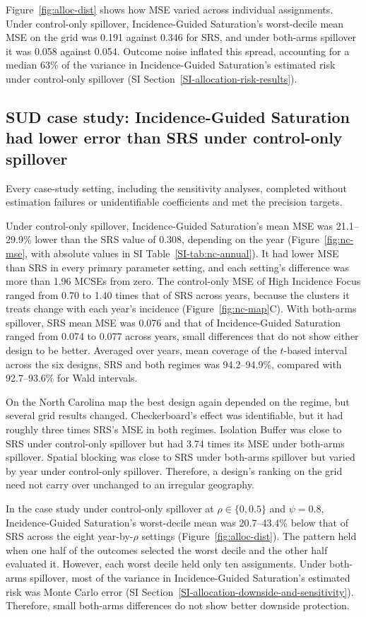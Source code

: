 \documentclass[Afour,sagev,times]{sagej}
\begin{document}
Figure~\ref{fig:alloc-dist} shows how MSE varied across individual assignments. Under control-only spillover, Incidence-Guided Saturation's worst-decile mean MSE on the grid was 0.191 against 0.346 for SRS, and under both-arms spillover it was 0.058 against 0.054. Outcome noise inflated this spread, accounting for a median 63\% of the variance in Incidence-Guided Saturation's estimated risk under control-only spillover (SI Section~\ref{SI-allocation-risk-results}).

\subsection{SUD case study: Incidence-Guided Saturation had lower error than SRS under control-only spillover}
Every case-study setting, including the sensitivity analyses, completed without estimation failures or unidentifiable coefficients and met the precision targets.

Under control-only spillover, Incidence-Guided Saturation's mean MSE was 21.1--29.9\% lower than the SRS value of 0.308, depending on the year (Figure~\ref{fig:nc-mse}, with absolute values in SI Table~\ref{SI-tab:nc-annual}). It had lower MSE than SRS in every primary parameter setting, and each setting's difference was more than 1.96 MCSEs from zero. The control-only MSE of High Incidence Focus ranged from 0.70 to 1.40 times that of SRS across years, because the clusters it treats change with each year's incidence (Figure~\ref{fig:nc-map}C). With both-arms spillover, SRS mean MSE was 0.076 and that of Incidence-Guided Saturation ranged from 0.074 to 0.077 across years, small differences that do not show either design to be better. Averaged over years, mean coverage of the $t$-based interval across the six designs, SRS and both regimes was 94.2--94.9\%, compared with 92.7--93.6\% for Wald intervals.
\ifctjreading
\CTJMeanFigure
\fi

On the North Carolina map the best design again depended on the regime, but several grid results changed. Checkerboard's effect was identifiable, but it had roughly three times SRS's MSE in both regimes. Isolation Buffer was close to SRS under control-only spillover but had 3.74 times its MSE under both-arms spillover. Spatial blocking was close to SRS under both-arms spillover but varied by year under control-only spillover. Therefore, a design's ranking on the grid need not carry over unchanged to an irregular geography.

In the case study under control-only spillover at $\rho\in\{0,0.5\}$ and $\psi=0.8$, Incidence-Guided Saturation's worst-decile mean was 20.7--43.4\% below that of SRS across the eight year-by-$\rho$ settings (Figure~\ref{fig:alloc-dist}). The pattern held when one half of the outcomes selected the worst decile and the other half evaluated it. However, each worst decile held only ten assignments. Under both-arms spillover, most of the variance in Incidence-Guided Saturation's estimated risk was Monte Carlo error (SI Section~\ref{SI-allocation-downside-and-sensitivity}). Therefore, small both-arms differences do not show better downside protection.
\end{document}
